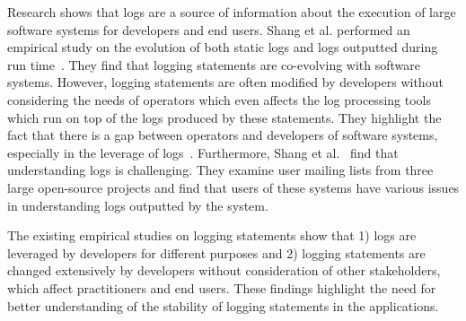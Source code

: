 Research shows that logs are a source of information about the execution of large software systems for developers and end users. Shang et al. performed an empirical study on the evolution of both static logs and logs outputted during run time~\cite{EMSEIAN,PaperIanCIIII}. They find that logging statements are co-evolving with software systems. However, logging statements are often modified by developers without considering the needs of operators which even affects the log processing tools which run on top of the logs produced by these statements. They highlight the fact that there is a gap between operators and developers of software systems, especially in the leverage of logs~\cite{IanGap}. Furthermore, Shang et al.~\cite{IanIcesm} find that understanding logs is challenging. They examine user mailing lists from three large open-source projects and find that users of these systems have various issues in understanding logs outputted by the system. 


The existing empirical studies on logging statements show that 1) logs are leveraged by developers for different purposes and 2) logging statements are changed extensively by developers without consideration of other stakeholders,  which affect practitioners and end users. These findings highlight the need for better understanding of the stability of logging statements in the applications. 




  


